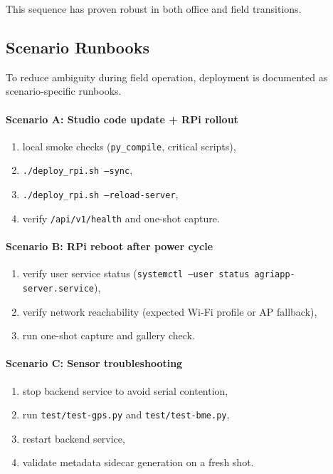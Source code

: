This sequence has proven robust in both office and field transitions.

\subsection{Scenario Runbooks}
To reduce ambiguity during field operation, deployment is documented as scenario-specific runbooks.

\paragraph{Scenario A: Studio code update + RPi rollout}
\begin{enumerate}
  \item local smoke checks (\texttt{py\_compile}, critical scripts),
  \item \texttt{./deploy\_rpi.sh --sync},
  \item \texttt{./deploy\_rpi.sh --reload-server},
  \item verify \texttt{/api/v1/health} and one-shot capture.
\end{enumerate}

\paragraph{Scenario B: RPi reboot after power cycle}
\begin{enumerate}
  \item verify user service status (\texttt{systemctl --user status agriapp-server.service}),
  \item verify network reachability (expected Wi-Fi profile or AP fallback),
  \item run one-shot capture and gallery check.
\end{enumerate}

\paragraph{Scenario C: Sensor troubleshooting}
\begin{enumerate}
  \item stop backend service to avoid serial contention,
  \item run \texttt{test/test-gps.py} and \texttt{test/test-bme.py},
  \item restart backend service,
  \item validate metadata sidecar generation on a fresh shot.
\end{enumerate}

